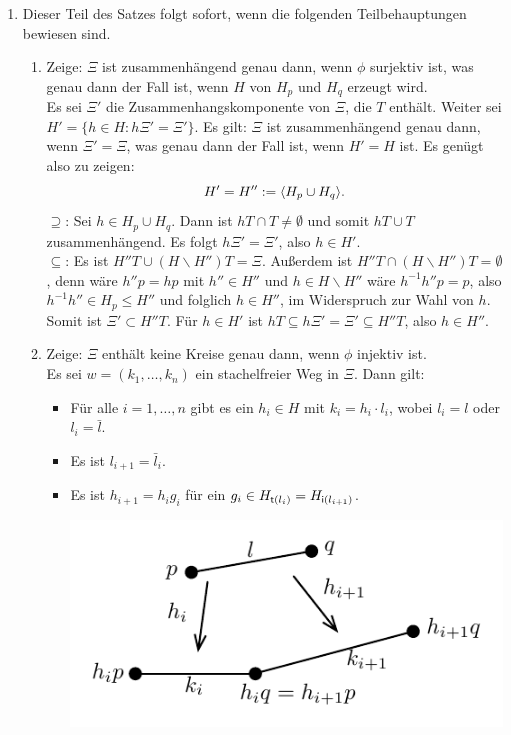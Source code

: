\documentclass[a4paper, 12pt, twoside]{article}
\begin{document}
\bew \begin{enumerate}
\item Dieser Teil des Satzes folgt sofort, wenn die folgenden
Teilbehauptungen bewiesen sind.
\begin{enumerate}
\item Zeige: $\Xi$ ist zusammenhängend genau dann, wenn $\phi$
surjektiv ist, was genau dann der Fall ist, wenn
$H$ von $H_p$ und $H_q$ erzeugt wird.\\
Es sei $\Xi'$ die Zusammenhangskomponente von $\Xi$, die $T$ enthält.
Weiter sei $H'=\{ h\in H : h\Xi' = \Xi' \}$.
Es gilt: $\Xi$ ist zusammenhängend genau dann, wenn $\Xi'=\Xi$, was
genau dann der Fall ist, wenn $H'=H$ ist.
Es genügt also zu zeigen:
\[
H' = H'' := \langle H_p \cup H_q \rangle.
\]
\glqq$\supseteq$\grqq:
Sei $h\in H_p\cup H_q$. Dann ist
$hT\cap T\neq\emptyset$ und somit $hT\cup T$ zusammenhängend.
Es folgt $h\Xi'=\Xi'$, also $h\in H'$.\\
\glqq$\subseteq$\grqq:
Es ist $H'' T\cup(H\backslash H'')T= \Xi$. Außerdem ist
$H'' T\cap(H\backslash H'')T = \emptyset$, denn wäre
$h''p=hp$ mit $h''\in H''$ und $h\in H\backslash H''$
wäre $h^{-1}h''p=p$, also $h^{-1}h''\in H_p\leq H''$ und folglich
$h\in H''$, im Widerspruch zur Wahl von $h$.
Somit ist $\Xi'\subset H'' T$. Für $h\in H'$ ist
$hT\subseteq h\Xi'=\Xi'\subseteq H'' T$, also $h\in H''$.
\item Zeige: $\Xi$ enthält keine Kreise genau dann, wenn
$\phi$ injektiv ist.\\
Es sei $w=(k_1,\ldots,k_n)$ ein stachelfreier Weg in $\Xi$.
Dann gilt:
\begin{itemize}
\item Für alle $i=1,\ldots,n$ gibt es ein $h_i\in H$ mit
$k_i=h_i\cdot l_i$, wobei $l_i = l$ oder $l_i = \bar{l}$.
\item Es ist $l_{i+1}=\bar{l}_i$.
\item Es ist $h_{i+1}=h_i g_i$ für ein
$g_i\in H_{\mathsf{t}(l_i)}=H_{\mathsf{i}(l_{i+1})}$.
\begin{center}
	\includegraphics{grugraImages/pql}

\end{center}
\end{itemize}
\end{enumerate}
\end{enumerate}
\end{document}
